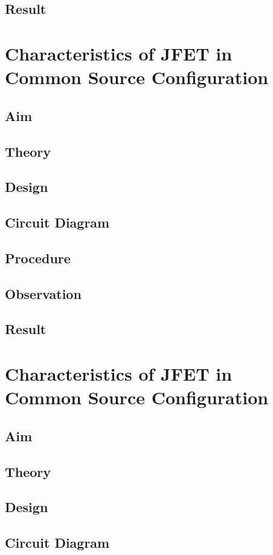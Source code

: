 \documentclass{book}
\begin{document}
\section*{Result}
\chapter[Characteristics of JFET in Common Drain Configuration]{Characteristics of JFET in Common Source Configuration}
\section*{Aim}
\section*{Theory}
\section*{Design}
\section*{Circuit Diagram}
\section*{Procedure}
\section*{Observation}
\section*{Result}
\chapter[Characteristics of MOSFET in Common Source Configuration]{Characteristics of JFET in Common Source Configuration}
\section*{Aim}
\section*{Theory}
\section*{Design}
\section*{Circuit Diagram}
\end{document}
